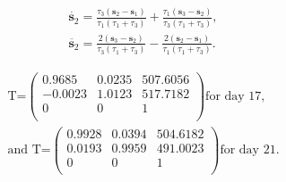 \documentclass{article}
\begin{document}
\begin{equation}
\begin{split}
\dot{\textbf{s}_{2}}= \frac{ \tau_{3}(\textbf{s}_{2}-\textbf{s}_{1})}{\tau_{1}(\tau_{1}+\tau_{3})} + \frac{\tau_{1}(\textbf{s}_{3}-\textbf{s}_{2})}{\tau_{3}(\tau_{1}+\tau_{3})},\\
\ddot{\textbf{s}_{2}}= \frac{2(\textbf{s}_{3}-\textbf{s}_{2})}{\tau_{3}(\tau_{1}+\tau_{3})} - \frac{2(\textbf{s}_{2}-\textbf{s}_{1})}{\tau_{1}(\tau_{1}+\tau_{3})} .
\end{split}
\end{equation}



\begin{equation}
\begin{split}
\text{T=}
\begin{pmatrix}
0.9685  & 0.0235 & 507.6056 \\
-0.0023 & 1.0123 & 517.7182 \\ 
0 & 0 &  1 \\
\end{pmatrix}
\text{for day 17,}\\ 
\text{and T=}
\begin{pmatrix}
0.9928 & 0.0394 & 504.6182 \\
0.0193 & 0.9959 & 491.0023 \\ 
0 & 0 &  1 \\
\end{pmatrix}
\text{for day 21.}
\end{split}
\end{equation} 
\end{document}
